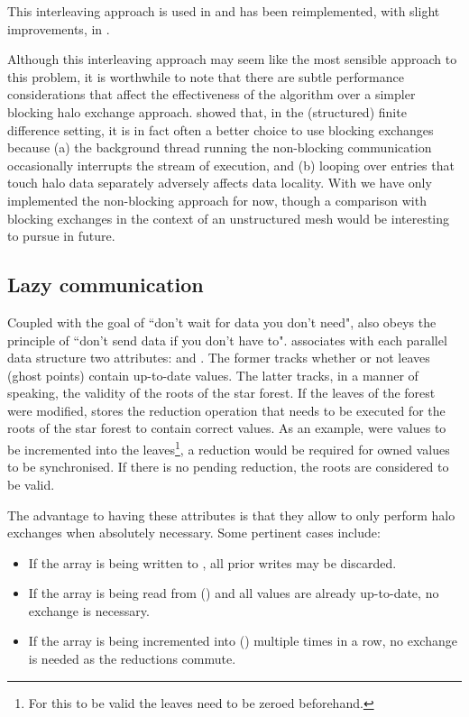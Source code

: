 \documentclass[thesis]{subfiles}
\begin{document}
This interleaving approach is used in  and has been reimplemented, with slight improvements, in .

Although this interleaving approach may seem like the most sensible approach to this problem, it is worthwhile to note that there are subtle performance considerations that affect the effectiveness of the algorithm over a simpler blocking halo exchange approach.
\cite{bisbasAutomatedMPICode2023} showed that, in the (structured) finite difference setting, it is in fact often a better choice to use blocking exchanges because
(a) the background thread running the non-blocking communication occasionally interrupts the stream of execution, and
(b) looping over entries that touch halo data separately adversely affects data locality.
With  we have only implemented the non-blocking approach for now, though a comparison with blocking exchanges in the context of an unstructured mesh would be interesting to pursue in future.

\subsection{Lazy communication}

Coupled with the goal of ``don't wait for data you don't need",  also obeys the principle of ``don't send data if you don't have to".
 associates with each parallel data structure two attributes:  and .
The former tracks whether or not leaves (ghost points) contain up-to-date values.
The latter tracks, in a manner of speaking, the validity of the roots of the star forest.
If the leaves of the forest were modified,  stores the reduction operation that needs to be executed for the roots of the star forest to contain correct values.
As an example, were values to be incremented into the leaves\footnote{For this to be valid the leaves need to be zeroed beforehand.}, a  reduction would be required for owned values to be synchronised.
If there is no pending reduction, the roots are considered to be valid.

The advantage to having these attributes is that they allow  to only perform halo exchanges when absolutely necessary.
Some pertinent cases include:

\begin{itemize}
  \item If the array is being written to , all prior writes may be discarded.
  \item If the array is being read from () and all values are already up-to-date, no exchange is necessary.
  \item If the array is being incremented into () multiple times in a row, no exchange is needed as the reductions commute.
\end{itemize}
\end{document}
